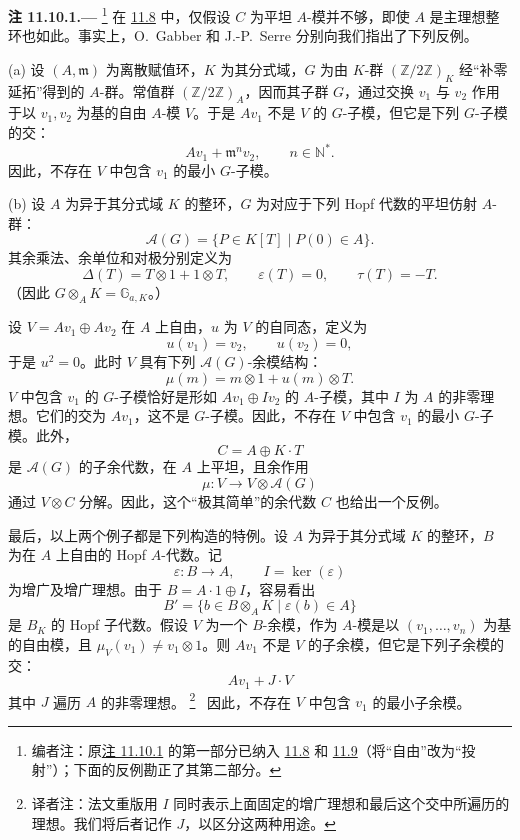 \medskip
{}\label{rem:sga3-VIB-11.10.1}%
\noindent\textbf{注 11.10.1.---}%
\footnote{\label{note:sga3-VIB-120}编者注：原\hyperref[rem:sga3-VIB-11.10.1]{注 11.10.1} 的第一部分已纳入 \hyperref[lem:sga3-VIB-11.8]{11.8} 和 \hyperref[prop:sga3-VIB-11.9]{11.9}\textup{（将``自由''改为``投射''）}；下面的反例勘正了其第二部分。}
在 \hyperref[lem:sga3-VIB-11.8]{11.8} 中，仅假设 \(C\) 为平坦 \(A\)-模并不够，即使 \(A\) 是主理想整环也如此。事实上，O.\ Gabber 和 J.-P.\ Serre 分别向我们指出了下列反例。

\smallskip
{}\label{rem:sga3-VIB-11.10.1-a}%
\noindent\textup{(a)}
设 \((A,\mathfrak m)\) 为离散赋值环，\(K\) 为其分式域，\(G\) 为由 \(K\)-群 \((\mathbb Z/2\mathbb Z)_K\) 经``补零延拓''得到的 \(A\)-群。常值群 \((\mathbb Z/2\mathbb Z)_A\)，因而其子群 \(G\)，通过交换 \(v_1\) 与 \(v_2\) 作用于以 \(v_1,v_2\) 为基的自由 \(A\)-模 \(V\)。于是 \(Av_1\) 不是 \(V\) 的 \(G\)-子模，但它是下列 \(G\)-子模的交：
\[
  Av_1+\mathfrak m^n v_2,\qquad n\in\mathbb N^*.
\]
因此，不存在 \(V\) 中包含 \(v_1\) 的最小 \(G\)-子模。

\smallskip
{}\label{rem:sga3-VIB-11.10.1-b}%
\noindent\textup{(b)}
设 \(A\) 为异于其分式域 \(K\) 的整环，\(G\) 为对应于下列 Hopf 代数的平坦仿射 \(A\)-群：
\label{form:sga3-VIB-11.10.1-Hopf-example}%
\[
  \mathcal A(G)=\{P\in K[T]\mid P(0)\in A\}.
\]
其余乘法、余单位和对极分别定义为
\[
  \Delta(T)=T\otimes1+1\otimes T,\qquad
  \varepsilon(T)=0,\qquad
  \tau(T)=-T.
\]
\textup{（因此 \(G\otimes_AK=\mathbb G_{a,K}\)。）}

设 \(V=Av_1\oplus Av_2\) 在 \(A\) 上自由，\(u\) 为 \(V\) 的自同态，定义为
\[
  u(v_1)=v_2,\qquad u(v_2)=0,
\]
于是 \(u^2=0\)。此时 \(V\) 具有下列 \(\mathcal A(G)\)-余模结构：
\label{form:sga3-VIB-11.10.1-coaction}%
\[
  \mu(m)=m\otimes1+u(m)\otimes T.
\]
\(V\) 中包含 \(v_1\) 的 \(G\)-子模恰好是形如 \(Av_1\oplus Iv_2\) 的 \(A\)-子模，其中 \(I\) 为 \(A\) 的非零理想。它们的交为 \(Av_1\)，这不是 \(G\)-子模。因此，不存在 \(V\) 中包含 \(v_1\) 的最小 \(G\)-子模。此外，
\[
  C=A\oplus K\cdot T
\]
是 \(\mathcal A(G)\) 的子余代数，在 \(A\) 上平坦，且余作用
\[
  \mu:V\longrightarrow V\otimes\mathcal A(G)
\]
通过 \(V\otimes C\) 分解。因此，这个``极其简单''的余代数 \(C\) 也给出一个反例。

最后，以上两个例子都是下列构造的特例。设 \(A\) 为异于其分式域 \(K\) 的整环，\(B\) 为在 \(A\) 上自由的 Hopf \(A\)-代数。记
\[
  \varepsilon:B\longrightarrow A,\qquad
  I=\ker(\varepsilon)
\]
为增广及增广理想。由于 \(B=A\cdot1\oplus I\)，容易看出
\label{form:sga3-VIB-11.10.1-B-prime}%
\[
  B'=\{b\in B\otimes_AK\mid \varepsilon(b)\in A\}
\]
是 \(B_K\) 的 Hopf 子代数。假设 \(V\) 为一个 \(B\)-余模，作为 \(A\)-模是以 \((v_1,\ldots,v_n)\) 为基的自由模，且 \(\mu_V(v_1)\neq v_1\otimes1\)。则 \(Av_1\) 不是 \(V\) 的子余模，但它是下列子余模的交：
\[
  Av_1+J\cdot V
\]
其中 \(J\) 遍历 \(A\) 的非零理想。%
\begingroup
\renewcommand{\thefootnote}{\fnsymbol{footnote}}%
\footnote[1]{\label{note:sga3-VIB-11.10.1-ideal-letter}
译者注：法文重版用 \(I\) 同时表示上面固定的增广理想和最后这个交中所遍历的理想。我们将后者记作 \(J\)，以区分这两种用途。}%
\endgroup\ 
因此，不存在 \(V\) 中包含 \(v_1\) 的最小子余模。

